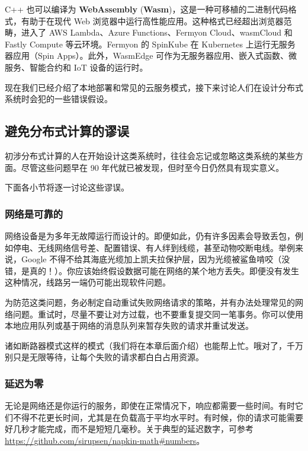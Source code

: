 \label{idx:283}
C++ 也可以编译为 \textbf{WebAssembly }(\textbf{Wasm})，这是一种可移植的二进制代码格式，有助于在现代 Web 浏览器中运行高性能应用。这种格式已经超出浏览器范畴，进入了 AWS Lambda、Azure Functions、Fermyon Cloud、wasmCloud 和 Fastly Compute 等云环境。Fermyon 的 SpinKube 在 Kubernetes 上运行无服务器应用（Spin Apps）。此外，WasmEdge 可作为无服务器应用、嵌入式函数、微服务、智能合约和 IoT 设备的运行时。

现在我们已经介绍了本地部署和常见的云服务模式，接下来讨论人们在设计分布式系统时会犯的一些错误假设。

\subsection{避免分布式计算的谬误}

\label{idx:284}
\label{idx:285}
初涉分布式计算的人在开始设计这类系统时，往往会忘记或忽略这类系统的某些方面。尽管这些问题早在 90 年代就已被发现，但时至今日仍然具有现实意义。

下面各小节将逐一讨论这些谬误。

\subsubsection{网络是可靠的}

网络设备是为多年无故障运行而设计的。即便如此，仍有许多因素会导致丢包，例如停电、无线网络信号差、配置错误、有人绊到线缆，甚至动物咬断电线。举例来说，Google 不得不给其海底光缆加上凯夫拉保护层，因为光缆被鲨鱼啃咬（没错，是真的！）。你应该始终假设数据可能在网络的某个地方丢失。即便没有发生这种情况，线路另一端仍可能出现软件问题。

\label{idx:286}
为防范这类问题，务必制定自动重试失败网络请求的策略，并有办法处理常见的网络问题。重试时，尽量不要让对方过载，也不要重复提交同一笔事务。你可以使用本地应用队列或基于网络的消息队列来暂存失败的请求并重试发送。

诸如断路器模式这样的模式（我们将在本章后面介绍）也能帮上忙。哦对了，千万别只是无限等待，让每个失败的请求都白白占用资源。

\subsubsection{延迟为零}

无论是网络还是你运行的服务，即使在正常情况下，响应都需要一些时间。有时它们不得不花更长时间，尤其是在负载高于平均水平时。有时候，你的请求可能需要好几秒才能完成，而不是短短几毫秒。关于典型的延迟数字，可参考 \href{https://github.com/sirupsen/napkin-math\#numbers}{https://github.com/sirupsen/napkin-math\#numbers}。

